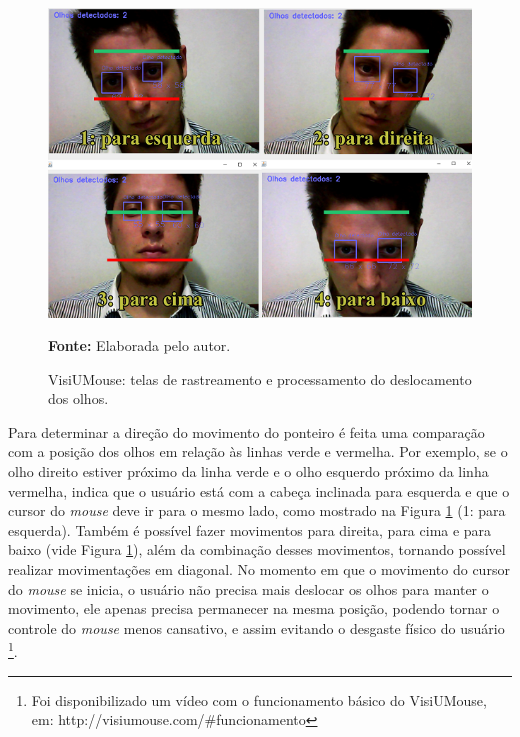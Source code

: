 \begin{figure}[H]
\caption{VisiUMouse: telas de rastreamento e processamento do deslocamento dos olhos.}
\centering \includegraphics[scale=.8]{img/funcionamento2.png}

{\fontsize{11}{11}\selectfont \textbf{Fonte:} Elaborada pelo autor.}
\label{fig:funcionamento}
\end{figure}

Para determinar a direção do movimento do ponteiro é feita uma comparação com a posição dos olhos em relação às linhas verde e vermelha. Por exemplo, se o olho direito estiver próximo da linha verde e o olho esquerdo próximo da linha vermelha, indica que o usuário está com a cabeça inclinada para esquerda e que o cursor do \textit{mouse} deve ir para o mesmo lado, como mostrado na Figura \ref{fig:funcionamento} (1: para esquerda). Também é possível fazer movimentos para direita, para cima e para baixo (vide Figura \ref{fig:funcionamento}), além da combinação desses movimentos, tornando possível realizar movimentações em diagonal. No momento em que o movimento do cursor do \textit{mouse} se inicia, o usuário não precisa mais deslocar os olhos para manter o movimento, ele apenas precisa permanecer na mesma posição, podendo tornar o controle do \textit{mouse} menos cansativo, e assim evitando o desgaste físico do usuário \footnote{Foi disponibilizado um vídeo com o funcionamento básico do VisiUMouse, em: http://visiumouse.com/\#funcionamento}. 




